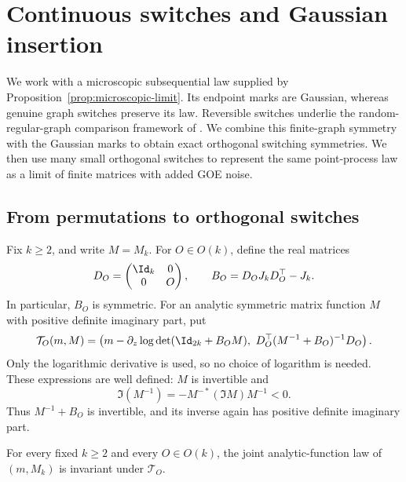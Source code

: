 \section{Continuous switches and Gaussian insertion}\label{sec:switching}

We work with a microscopic subsequential law supplied by
Proposition~\ref{prop:microscopic-limit}. Its endpoint marks are Gaussian,
whereas genuine graph switches preserve its law. Reversible switches
underlie the random-regular-graph comparison framework of
\citet[Section~3]{BauerschmidtEtAl}. We combine this finite-graph symmetry
with the Gaussian marks to obtain exact orthogonal switching symmetries.
We then use many small orthogonal switches to represent the same
point-process law as a limit of finite matrices with added GOE noise.

\subsection{From permutations to orthogonal switches}

Fix \(k\ge2\), and write \(M=M_k\). For \(O\in O(k)\), define the real matrices
\begin{equation}\label{eq:sw-definitions}
 D_O=\begin{pmatrix}\Id_k&0\\0&O\end{pmatrix},
 \qquad
 B_O=D_OJ_kD_O^\top-J_k.
\end{equation}
In particular, \(B_O\) is symmetric. For an analytic symmetric matrix function
\(M\) with positive definite imaginary part, put
\begin{equation}\label{eq:sw-transformation}
 \mathcal T_O(m,M)=
 \left(
 m-\partial_z\log\det(\Id_{2k}+B_OM),\
 D_O^\top(M^{-1}+B_O)^{-1}D_O
 \right).
\end{equation}
Only the logarithmic derivative is used, so no choice of logarithm is needed.
These expressions are well defined: \(M\) is invertible and
\[
 \Im(M^{-1})=-M^{-*}(\Im M)M^{-1}<0.
\]
Thus \(M^{-1}+B_O\) is invertible, and its inverse again has positive definite
imaginary part.

\begin{proposition}
\label{prop:continuous-switching}
For every fixed \(k\ge2\) and every \(O\in O(k)\), the joint analytic-function
law of \((m,M_k)\) is invariant under \(\mathcal T_O\).
\end{proposition}

